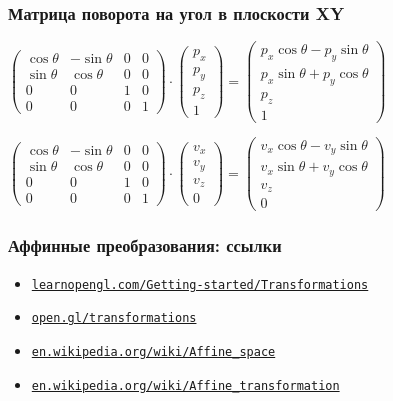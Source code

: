 \documentclass[10pt]{beamer}
\begin{document}
\begin{frame}[fragile]
\frametitle{Матрица поворота на угол в плоскости XY}
\begin{center}
\begin{math}
\begin{pmatrix}
\cos \theta & - \sin \theta & 0 & 0 \\
\sin \theta & \cos \theta & 0 & 0 \\
0 & 0 & 1 & 0 \\
0 & 0 & 0 & 1
\end{pmatrix}
\cdot
\begin{pmatrix}
p_x \\
p_y \\
p_z \\
1
\end{pmatrix}
=
\begin{pmatrix}
p_x \cos \theta - p_y \sin \theta \\
p_x \sin \theta + p_y \cos \theta \\
p_z \\
1
\end{pmatrix}
\end{math}

\begin{math}
\begin{pmatrix}
\cos \theta & - \sin \theta & 0 & 0 \\
\sin \theta & \cos \theta & 0 & 0 \\
0 & 0 & 1 & 0 \\
0 & 0 & 0 & 1
\end{pmatrix}
\cdot
\begin{pmatrix}
v_x \\
v_y \\
v_z \\
0
\end{pmatrix}
=
\begin{pmatrix}
v_x \cos \theta - v_y \sin \theta \\
v_x \sin \theta + v_y \cos \theta \\
v_z \\
0
\end{pmatrix}
\end{math}
\end{center}
\end{frame}

\begin{frame}
\frametitle{Аффинные преобразования: ссылки}
\begin{itemize}
\item \href{https://learnopengl.com/Getting-started/Transformations}{\nolinkurl{learnopengl.com/Getting-started/Transformations}}
\item \href{https://open.gl/transformations}{\nolinkurl{open.gl/transformations}}
\item \href{https://en.wikipedia.org/wiki/Affine_space}{\nolinkurl{en.wikipedia.org/wiki/Affine\_space}}
\item \href{https://en.wikipedia.org/wiki/Affine_transformation}{\nolinkurl{en.wikipedia.org/wiki/Affine\_transformation}}
\end{itemize}
\end{frame}
\end{document}
